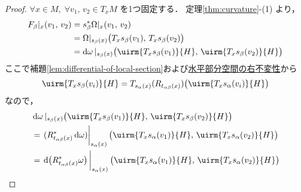 \documentclass[geometry_main]{subfiles}
\begin{document}
\begin{proof}
    $\forall x \in M,\; \forall v_1,\, v_2 \in T_x M$ を1つ固定する．
    定理\ref{thm:curvature}-(1) より，
    \begin{align}
        F_\beta|_x (v_1,\, v_2)
        &= s_\beta^* \Omega|_x(v_1,\, v_2) \\
        &= \Omega|_{s_\beta(x)} \bigl( T_x s_\beta(v_1),\, T_x s_\beta(v_2) \bigr) \\
        &= \dd{\omega}|_{s_\beta(x)} \bigl( \uirm{T_x s_\beta(v_1)}{H},\, \uirm{T_x s_\beta(v_2)}{H} \bigr)
    \end{align}
    ここで補題\ref{lem:differential-of-local-section}および\hyperref[def:connection]{水平部分空間の右不変性}から
    \begin{align}
        \uirm{T_x s_\beta(v_i)}{H} = T_{s_\alpha(x)}(R_{t_{\alpha\beta}(x)}) \bigl( \uirm{T_x s_\alpha(v_i)}{H}\bigr)
    \end{align}
    なので，
    \begin{align}
        &\dd{\omega}|_{s_\beta(x)} \bigl( \uirm{T_x s_\beta(v_1)}{H},\, \uirm{T_x s_\beta(v_2)}{H} \bigr) \\
        &= \eval{(R_{t_{\alpha\beta}(x)}^*\dd{\omega})}_{s_\alpha(x)} \bigl( \uirm{T_x s_\alpha(v_1)}{H},\, \uirm{T_x s_\alpha(v_2)}{H} \bigr) \\
        &= \eval{\dd{\bigl(R_{t_{\alpha\beta}(x)}^*\omega\bigr)}}_{s_\alpha(x)} \bigl( \uirm{T_x s_\alpha(v_1)}{H},\, \uirm{T_x s_\alpha(v_2)}{H} \bigr) \\

\end{align}
\end{proof}
\end{document}

